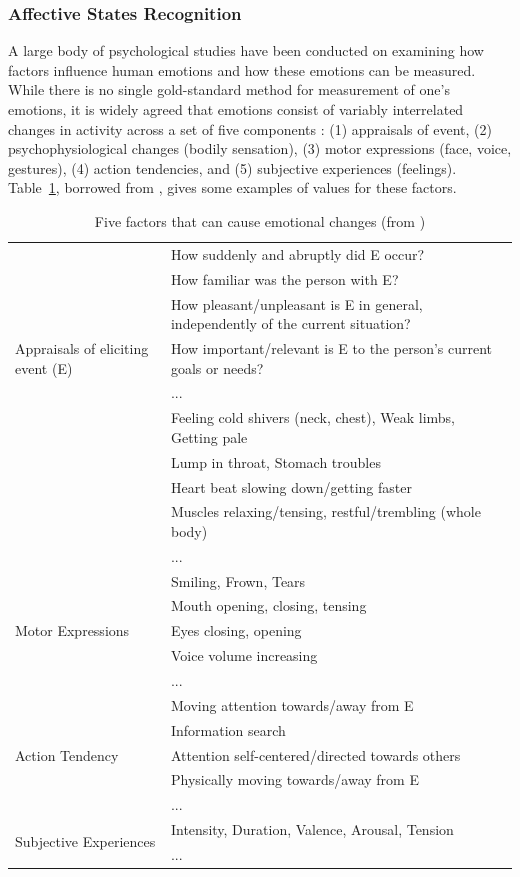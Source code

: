\subsubsection{Affective States Recognition}

A large body of psychological studies have been conducted on examining how factors influence human emotions and how these emotions can be measured. While there is no single gold-standard method for measurement of one's emotions, it is widely agreed that emotions consist of variably interrelated changes in activity across a set of five components \cite{scherer2005emotions}: (1) appraisals of event, (2) psychophysiological changes (bodily sensation), (3) motor expressions (face, voice, gestures), (4) action tendencies, and (5) subjective experiences (feelings). Table~\ref{table:emotion-factors}, borrowed from \cite{scherer2005emotions}, gives some examples of values for these factors.

\begin{table}
\centering
\caption{Five factors that can cause emotional changes (from \cite{scherer2005emotions})}
\label{table:emotion-factors}
\begin{tabular}{| p{4.4cm} | p{10.8cm} |}
\hline
\multirow{7}{4.4cm}{Appraisals of eliciting event (E)} & How suddenly and abruptly did E occur? \\
& How familiar was the person with E? \\
& How pleasant/unpleasant is E in general, independently of the current situation? \\
& How important/relevant is E to the person's current goals or needs? \\ 
& ... \\
\hline
\multirow{5}{4.4cm}{Physiological Symptoms} & Feeling cold shivers (neck, chest), Weak limbs, Getting pale \\
& Lump in throat, Stomach troubles \\
& Heart beat slowing down/getting faster \\
& Muscles relaxing/tensing, restful/trembling (whole body) \\
& ... \\
\hline
\multirow{5}{4.4cm}{Motor Expressions} & Smiling, Frown, Tears \\
& Mouth opening, closing, tensing \\
& Eyes closing, opening \\
& Voice volume increasing \\
& ... \\
\hline
\multirow{5}{4.4cm}{Action Tendency} & Moving attention towards/away from E \\
& Information search \\
& Attention self-centered/directed towards others \\
& Physically moving towards/away from E \\
& ... \\
\hline
\multirow{2}{4.4cm}{Subjective Experiences} & Intensity, Duration, Valence, Arousal, Tension \\
& ... \\
\hline
\end{tabular}
\end{table}

